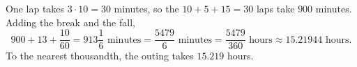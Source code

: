 One lap takes $3\cdot10=30$ minutes, so the $10+5+15=30$ laps take $900$ minutes. Adding the break and the fall,
\[
900+13+\dfrac{10}{60}=913\dfrac{1}{6}\text{ minutes}=\dfrac{5479}{6}\text{ minutes}=\dfrac{5479}{360}\text{ hours}\approx15.21944\text{ hours}.
\]
To the nearest thousandth, the outing takes $\boxed{15.219}$ hours.
